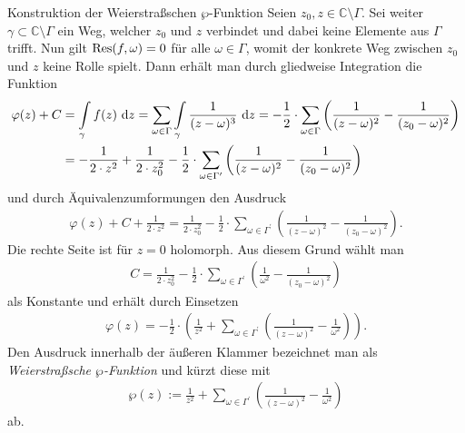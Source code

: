 \begin{genericdef}{Konstruktion der Weierstraßschen $\wp$-Funktion}\label{3.4}
Seien $z_0,z  \in \mathbb{C} \setminus \Gamma$. Sei weiter $\gamma \subset \mathbb C\setminus \Gamma$ ein Weg, welcher $z_0$ und $z$ verbindet
und dabei keine Elemente aus $\Gamma$ trifft.
Nun gilt 
$\operatorname{Res}(f,\omega) = 0$
für alle $\omega \in \Gamma$,
womit der konkrete Weg zwischen $z_0$ und $z$ keine Rolle spielt.
Dann erhält man durch gliedweise Integration die Funktion
\begin{align*}
\varphi(z) +C &= 
\int \limits_{\gamma} f(z)\  \text{\rmfamily d} z 
= \sum \limits_{\omega \in \Gamma} \int \limits_{\gamma} \frac{1}{(z-\omega)^3} \ \text{\rmfamily d} z 
= -\frac{1}{2} \cdot 
\sum \limits_{\omega \in \Gamma} \left(\frac{1}{(z-\omega)^2} -\frac{1}{(z_0-\omega)^2} \right) \\
&=-\frac{1}{2\cdot z^2} + \frac{1}{2 \cdot z_0^2} -\frac{1}{2} \cdot  \sum \limits_{\omega \in \Gamma^\prime} \left(\frac{1}{(z-\omega)^2} -\frac{1}{(z_0-\omega)^2} \right) 
\end{align*}
und durch Äquivalenzumformungen den Ausdruck
\begin{align*}
\varphi(z) + C + \frac{1}{2\cdot z^2}
= \frac{1}{2 \cdot z_0^2} -\frac{1}{2} \cdot  \sum \limits_{\omega \in \Gamma^\prime} \left(\frac{1}{(z-\omega)^2} -\frac{1}{(z_0-\omega)^2} \right).
\end{align*}
Die rechte Seite ist für $z = 0$ holomorph. Aus diesem Grund wählt man
\begin{align*}
C = \frac{1}{2 \cdot z_0^2} - \frac{1}{2} \cdot  
\sum \limits_{\omega \in \Gamma^\prime} \left(\frac{1}{\omega^2} -\frac{1}{(z_0-\omega)^2} \right)
\end{align*}
als Konstante und erhält durch Einsetzen
\begin{align*}
\varphi(z)
=-\frac{1}{2} \cdot \left(\frac{1}{z^2} + 
\sum \limits_{\omega \in \Gamma^\prime} \left( \frac{1}{(z-\omega)^2} - \frac{1}{\omega^2} \right) \right).
\end{align*}
Den Ausdruck innerhalb der äußeren Klammer bezeichnet man als \textit{Weierstraßsche $\wp$-Funktion} und kürzt diese mit
\begin{align*}
\wp(z) :=\frac{1}{z^2} + \sum \limits_{\omega \in \Gamma^\prime} \left( \frac{1}{(z-\omega)^2} - \frac{1}{\omega^2} \right)
\end{align*}
ab.
\end{genericdef}

